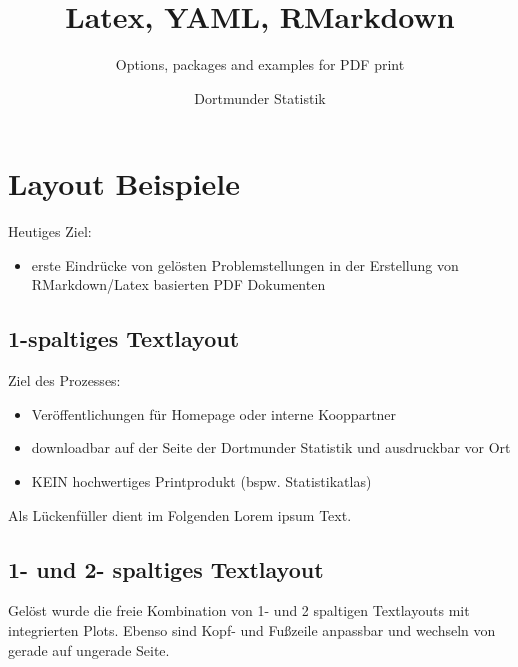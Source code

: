 \documentclass[
  a4paper,
  twoside]{article}
\title{Latex, YAML, RMarkdown}
\subtitle{Options, packages and examples for PDF print}
\author{Dortmunder Statistik}
\date{}
\providecommand{\tightlist}{%
  \setlength{\itemsep}{0pt}\setlength{\parskip}{0pt}}
\begin{document}
\maketitle

\renewcommand*\contentsname{Inhaltsverzeichnis}
{
\hypersetup{linkcolor=}
\setcounter{tocdepth}{4}
\tableofcontents
}
\newpage

\hypertarget{layout-beispiele}{%
\section{Layout Beispiele}\label{layout-beispiele}}

Heutiges Ziel:

\begin{itemize}
\tightlist
\item
  erste Eindrücke von gelösten Problemstellungen in der Erstellung von RMarkdown/Latex basierten PDF Dokumenten
\end{itemize}

\hypertarget{spaltiges-textlayout}{%
\subsection{1-spaltiges Textlayout}\label{spaltiges-textlayout}}

Ziel des Prozesses:

\begin{itemize}
\tightlist
\item
  Veröffentlichungen für Homepage oder interne Kooppartner
\item
  downloadbar auf der Seite der Dortmunder Statistik und ausdruckbar vor Ort
\item
  KEIN hochwertiges Printprodukt (bspw. Statistikatlas)
\end{itemize}

Als Lückenfüller dient im Folgenden Lorem ipsum Text.

\hypertarget{und-2--spaltiges-textlayout}{%
\subsection{1- und 2- spaltiges Textlayout}\label{und-2--spaltiges-textlayout}}

Gelöst wurde die freie Kombination von 1- und 2 spaltigen Textlayouts mit integrierten Plots. Ebenso sind Kopf- und Fußzeile anpassbar und wechseln von gerade auf ungerade Seite.
\end{document}
